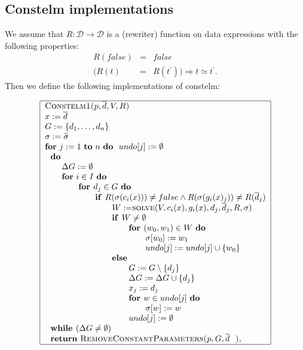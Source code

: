 \documentclass{article}
\begin{document}
\subsection{Constelm implementations}

We assume that $R:\mathcal{D\rightarrow D}$ is a (rewriter) function on data
expressions with the following properties:%
\begin{eqnarray*}
R(false) &=&false \\
(R(t) &=&R(t^{\prime }))\Rightarrow t\simeq t^{\prime }\text{.}
\end{eqnarray*}%
Then we define the following implementations of constelm:

\[
\begin{tabular}{|l|}
\hline
\textsc{Constelm1(}$p,\overline{d},V,R$\textsc{)} \\ 
$x:=\overline{d}$ \\ 
$G:=\{d_{1},\ldots ,d_{n}\}$ \\ 
$\sigma :=\widehat{\sigma }$ \\ 
\textbf{for} $j:=1$ \textbf{to} $n$ \textbf{do} \ $undo[j]:=\emptyset $ \\ 
$\text{\textbf{do}}$ \\ 
$\qquad \Delta G:=\emptyset $ \\ 
$\qquad $\textbf{for} $i\in I$ \textbf{do} \\ 
$\qquad \qquad $\textbf{for }$d_{j}\in G$ \textbf{do} \\ 
$\qquad \qquad \qquad $\textbf{if }$R(\sigma (c_{i}(x)))\neq false\wedge
R(\sigma (g_{i}(x)_{j}))\neq R(\overline{d}_{j})$ \\ 
$\qquad \qquad \qquad \qquad W:=$\textsc{solve}$(V,c_{i}(x),g_{i}(x),d_{j},%
\overline{d}_{j},R,\sigma )$ \\ 
$\qquad \qquad \qquad \qquad $\textbf{if }$W\neq \emptyset $ \\ 
$\qquad \qquad \qquad \qquad \qquad $\textbf{for }$(w_{0},w_{1})\in W$ 
\textbf{do} \\ 
$\qquad \qquad \qquad \qquad \qquad \qquad \sigma \lbrack w_{0}]:=w_{1}$ \\ 
$\qquad \qquad \qquad \qquad \qquad \qquad undo[j]:=undo[j]\cup \{w_{0}\}$
\\ 
$\qquad \qquad \qquad \qquad $\textbf{else} \\ 
$\qquad \qquad \qquad \qquad \qquad G:=G\setminus \{d_{j}\}$ \\ 
$\qquad \qquad \qquad \qquad \qquad \Delta G:=\Delta G\cup \{d_{j}\}$ \\ 
$\qquad \qquad \qquad \qquad \qquad x_{j}:=d_{j}$ \\ 
$\qquad \qquad \qquad \qquad \qquad $\textbf{for }$w\in undo[j]$ \textbf{do}
\\ 
$\qquad \qquad \qquad \qquad \qquad \qquad \sigma \lbrack w]:=w$ \\ 
$\qquad \qquad \qquad \qquad \qquad undo[j]:=\emptyset $ \\ 
$\text{\textbf{while }}(\Delta G\neq \emptyset )$ \\ 
$\text{\textbf{return} \textsc{RemoveConstantParameters(}}p,G,\overline{d}%
\text{\textsc{)}},$ \\ \hline
\end{tabular}%
\]%
\end{document}
